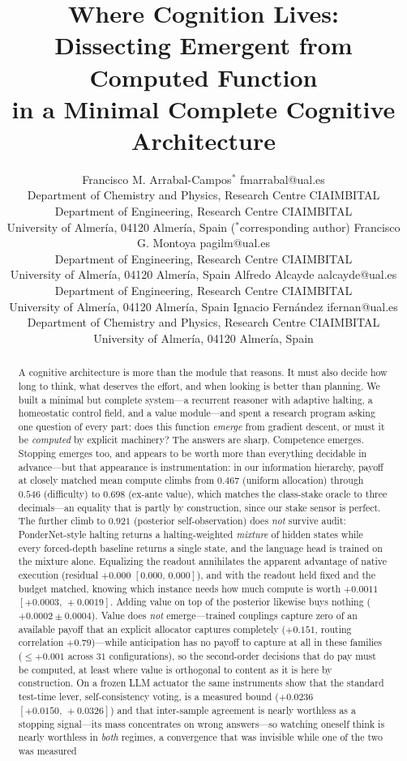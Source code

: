 \documentclass{article}
\title{Where Cognition Lives:\\ Dissecting Emergent from Computed Function\\
in a Minimal Complete Cognitive Architecture}
\author{\name Francisco M. Arrabal-Campos$^{\ast}$ \email fmarrabal@ual.es\\
\addr Department of Chemistry and Physics, Research Centre CIAIMBITAL\\
\addr Department of Engineering, Research Centre CIAIMBITAL\\
\addr University of Almer\'ia, 04120 Almer\'ia, Spain \quad ($^{\ast}$corresponding author)
\AND
\name Francisco G. Montoya \email pagilm@ual.es\\
\addr Department of Engineering, Research Centre CIAIMBITAL\\
\addr University of Almer\'ia, 04120 Almer\'ia, Spain
\AND
\name Alfredo Alcayde \email aalcayde@ual.es\\
\addr Department of Engineering, Research Centre CIAIMBITAL\\
\addr University of Almer\'ia, 04120 Almer\'ia, Spain
\AND
\name Ignacio Fern\'andez \email ifernan@ual.es\\
\addr Department of Chemistry and Physics, Research Centre CIAIMBITAL\\
\addr University of Almer\'ia, 04120 Almer\'ia, Spain}
\newcommand{\Hun}{$0.467$}
\newcommand{\Hdif}{$0.546$}
\newcommand{\Hval}{$0.698$}
\newcommand{\Hpost}{$0.921$}
\newcommand{\AunoDelta}{$+0.151$}
\newcommand{\RoutingExpl}{$+0.79$}
\newcommand{\VGBcero}{$+0.0002\pm0.0004$}
\newcommand{\LLMtecho}{$+0.0236$} \newcommand{\LLMtechoIC}{$[+0.0150,\,+0.0326]$}
\newcommand{\Rregimen}{$+0.000$} \newcommand{\RregimenIC}{$[0.000,\,0.000]$}
\newcommand{\Rasign}{$+0.0011$} \newcommand{\RasignIC}{$[+0.0003,\,+0.0019]$}
\begin{document}
\maketitle

\begin{abstract}
A cognitive architecture is more than the module that reasons. It must also
decide how long to think, what deserves the effort, and when looking is better
than planning. We built a minimal but complete system---a recurrent reasoner
with adaptive halting, a homeostatic control field, and a value module---and
spent a research program asking one question of every part: does this function
\emph{emerge} from gradient descent, or must it be \emph{computed} by explicit
machinery? The answers are sharp. Competence emerges. Stopping emerges too,
and appears to be worth more than everything decidable in advance---but that
appearance is instrumentation: in our information hierarchy,
payoff at closely matched mean compute climbs from \Hun{} (uniform
allocation) through \Hdif{} (difficulty) to \Hval{} (ex-ante value), which
matches the class-stake oracle to three decimals---an equality that is partly
by construction, since our stake sensor is perfect. The further climb to \Hpost{}
(posterior self-observation) does \emph{not} survive audit: PonderNet-style
halting returns a halting-weighted \emph{mixture} of hidden states while every
forced-depth baseline returns a single state, and the language head is trained
on the mixture alone. Equalizing the readout annihilates the apparent
advantage of native execution (residual \Rregimen{} \RregimenIC), and with the
readout held fixed and the budget matched, knowing which instance needs how
much compute is worth \Rasign{} \RasignIC. Adding value on top of the
posterior likewise buys nothing (\VGBcero). Value does \emph{not} emerge---trained couplings
capture zero of an available payoff that an explicit allocator captures
completely (\AunoDelta{}, routing correlation \RoutingExpl)---while
anticipation has no payoff to capture at all in these families ($\le+0.001$
across $31$ configurations), so the second-order decisions that do pay must be
computed, at least where value is orthogonal to content as it is here by
construction. On a frozen LLM actuator the same instruments show
that the standard test-time lever, self-consistency voting, is a measured
bound (\LLMtecho{} \LLMtechoIC) and that inter-sample agreement is nearly
worthless as a stopping signal---its mass concentrates on wrong
answers---so watching oneself think is nearly worthless in \emph{both}
regimes, a convergence that was invisible while one of the two was measured

\end{abstract}
\end{document}
